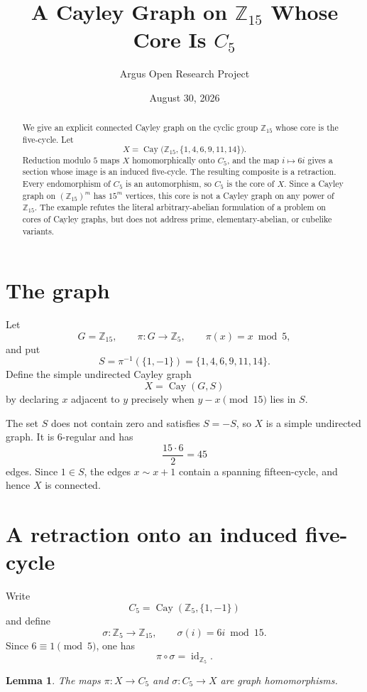 \documentclass[10pt,reqno]{amsart}
\title[A Cayley graph on \(\mathbb Z_{15}\) with core \(C_5\)]
{A Cayley Graph on \(\mathbb Z_{15}\) Whose Core Is \(C_5\)}
\author{Argus Open Research Project}
\date{August 30, 2026}
\newtheorem{lemma}[theorem]{Lemma}
\theoremstyle{definition}
\begin{document}
\begin{abstract}
We give an explicit connected Cayley graph on the cyclic group
\(\mathbb Z_{15}\) whose core is the five-cycle.  Let
\[
 X=\operatorname{Cay}\bigl(\mathbb Z_{15},
 \{1,4,6,9,11,14\}\bigr).
\]
Reduction modulo \(5\) maps \(X\) homomorphically onto \(C_5\), and the map
\(i\mapsto6i\) gives a section whose image is an induced five-cycle.  The
resulting composite is a retraction.  Every endomorphism of \(C_5\) is an
automorphism, so \(C_5\) is the core of \(X\).  Since a Cayley graph on
\((\mathbb Z_{15})^m\) has \(15^m\) vertices, this core is not a Cayley graph
on any power of \(\mathbb Z_{15}\).  The example refutes the literal
arbitrary-abelian formulation of a problem on cores of Cayley graphs, but
does not address prime, elementary-abelian, or cubelike variants.
\end{abstract}

\maketitle

\section{The graph}

Let
\[
 G=\mathbb Z_{15},\qquad
 \pi:G\longrightarrow\mathbb Z_5,\qquad \pi(x)=x\bmod5,
\]
and put
\[
 S=\pi^{-1}(\{1,-1\})
 =\{1,4,6,9,11,14\}.
\]
Define the simple undirected Cayley graph
\[
 X=\operatorname{Cay}(G,S)
\]
by declaring \(x\) adjacent to \(y\) precisely when
\(y-x\pmod {15}\) lies in \(S\).

The set \(S\) does not contain zero and satisfies \(S=-S\), so \(X\) is a
simple undirected graph.  It is \(6\)-regular and has
\[
 \frac{15\cdot6}{2}=45
\]
edges.  Since \(1\in S\), the edges \(x\sim x+1\) contain a spanning
fifteen-cycle, and hence \(X\) is connected.

\section{A retraction onto an induced five-cycle}

Write
\[
 C_5=\operatorname{Cay}(\mathbb Z_5,\{1,-1\})
\]
and define
\[
 \sigma:\mathbb Z_5\longrightarrow\mathbb Z_{15},
 \qquad \sigma(i)=6i\bmod15.
\]
Since \(6\equiv1\pmod5\), one has
\[
 \pi\circ\sigma=\operatorname{id}_{\mathbb Z_5}.
\]

\begin{lemma}\label{lem:maps}
The maps \(\pi:X\to C_5\) and \(\sigma:C_5\to X\) are graph
homomorphisms.
\end{lemma}
\end{document}
